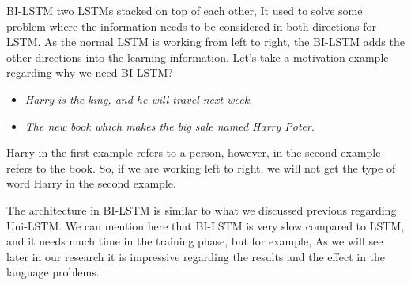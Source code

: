 BI-LSTM two LSTMs stacked on top of each other, It used to solve some problem where the information needs to be considered in both directions for LSTM. As the normal LSTM is working from left to right, the BI-LSTM adds the other directions into the learning information. Let's take a motivation example regarding why we need BI-LSTM?
\begin{itemize}
\item \textit{Harry is the king, and he will travel next week.}
\item \textit{The new book which makes the big sale named Harry Poter}.
\end{itemize}
Harry in the first example refers to a person, however, in the second example refers to the book. So, if we are working left to right, we will not get the type of word Harry in the second example.

The architecture in BI-LSTM is similar to what we discussed previous regarding Uni-LSTM. We can mention here that BI-LSTM is very slow compared to LSTM, and it needs much time in the training phase, but for example, As we will see later in our research it is impressive regarding the results and the effect in the language problems.

